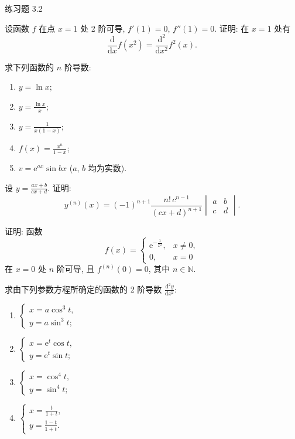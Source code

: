 \begin{exblock}{练习题 3.2}
  \item 设函数 $f$ 在点 $x = 1$ 处 2 阶可导, $f'(1) = 0$, $f''(1) = 0$. 证明: 在 $x = 1$ 处有
  \[
  \frac{\mathrm{d}}{\mathrm{d}x}f(x^{2}) = \frac{\mathrm{d}^{2}}{\mathrm{d}x^{2}}f^{2}(x).
\]

  \item 求下列函数的 $n$ 阶导数:
  \begin{enumerate}[label=(\arabic*)]
    \item $y = \ln x$;
    \item $y = \frac{\ln x}{x}$;
    \item $y = \frac{1}{x(1-x)}$;
    \item $f(x) = \frac{x^{n}}{1-x}$;
    \item $v = \mathrm{e}^{ax}\sin bx$ ($a$, $b$ 均为实数).
  \end{enumerate}

  \item 设 $y = \frac{ax+b}{cx+d}$. 证明:
  \[
  y^{(n)}(x) = (-1)^{n+1}\frac{n!\,c^{n-1}}{(cx+d)^{n+1}}\begin{vmatrix}a & b\\ c & d\end{vmatrix}.
\]

  \item 证明: 函数
  \[
  f(x) = \begin{cases}\mathrm{e}^{-\frac{1}{x^{2}}}, & x \neq 0,\\ 0, & x = 0\end{cases}
\]
  在 $x = 0$ 处 $n$ 阶可导, 且 $f^{(n)}(0) = 0$, 其中 $n \in \mathbb{N}$.

  \item 求由下列参数方程所确定的函数的 2 阶导数 $\frac{\mathrm{d}^{2}y}{\mathrm{d}x^{2}}$:
  \begin{enumerate}[label=(\arabic*)]
    \item $\begin{cases}x = a\cos^{3}t,\\ y = a\sin^{3}t;\end{cases}$
    \item $\begin{cases}x = \mathrm{e}^{t}\cos t,\\ y = \mathrm{e}^{t}\sin t;\end{cases}$
    \item $\begin{cases}x = \cos^{4}t,\\ y = \sin^{4}t;\end{cases}$
    \item $\begin{cases}x = \frac{t}{1+t},\\ y = \frac{1-t}{1+t}.\end{cases}$
  \end{enumerate}


\end{exblock}
